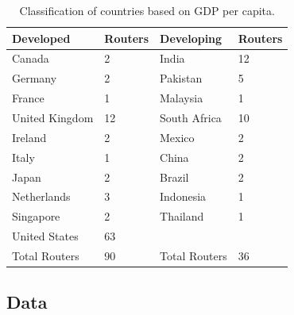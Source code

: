 \begin{table}[t]
\small
\begin{tabular}{m{} m{} | m{} m{}}
{\bf Developed} & {\bf Routers} & {\bf Developing} & {\bf Routers}\\
\hline
Canada & 2 & India & 12\\
Germany & 2 & Pakistan & 5\\
France & 1 & Malaysia & 1\\
United Kingdom & 12 & South Africa & 10\\
Ireland & 2 & Mexico & 2\\
Italy & 1 & China & 2\\
Japan & 2 & Brazil & 2\\
Netherlands & 3 & Indonesia & 1\\
Singapore & 2 & Thailand & 1\\
United States & 63 & {} & {}\\
\hline
Total Routers & 90 & Total Routers  & 36\\
\end{tabular}
\centering\caption{Classification of countries based on GDP per capita.}
\label{tab:grouping}
\end{table}

\subsection{Data}

